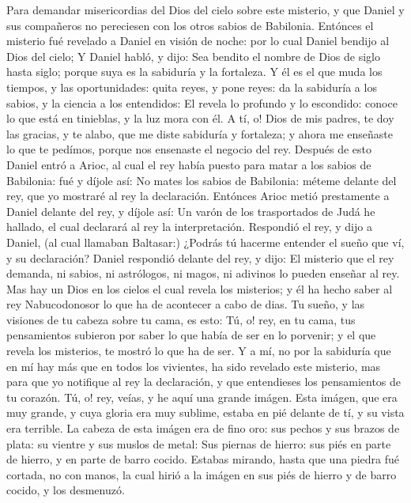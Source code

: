 \bverse Para demandar misericordias del Dios del cielo sobre este misterio, y que Daniel y sus compañeros no pereciesen con los otros sabios de Babilonia.
\bverse Entónces el misterio fué revelado a Daniel en visión de noche: por lo cual Daniel bendijo al Dios del cielo;
\bverse Y Daniel habló, y dijo: Sea bendito el nombre de Dios de siglo hasta siglo; porque suya es la sabiduría y la fortaleza.
\bverse Y él es el que muda los tiempos, y las oportunidades: quita reyes, y pone reyes: da la sabiduría a los sabios, y la ciencia a los entendidos:
\bverse El revela lo profundo y lo escondido: conoce lo que está en tinieblas, y la luz mora con él.
\bverse A tí, o! Dios de mis padres, te doy las gracias, y te alabo, que me diste sabiduría y fortaleza; y ahora me enseñaste lo que te pedímos, porque nos ensenaste el negocio del rey.
\bverse Después de esto Daniel entró a Arioc, al cual el rey había puesto para matar a los sabios de Babilonia: fué y díjole así: No mates los sabios de Babilonia: méteme delante del rey, que yo mostraré al rey la declaración.
\bverse Entónces Arioc metió prestamente a Daniel delante del rey, y díjole así: Un varón de los trasportados de Judá he hallado, el cual declarará al rey la interpretación.
\bverse Respondió el rey, y dijo a Daniel, (al cual llamaban Baltasar:) ¿Podrás tú hacerme entender el sueño que ví, y su declaración?
\bverse Daniel respondió delante del rey, y dijo: El misterio que el rey demanda, ni sabios, ni astrólogos, ni magos, ni adivinos lo pueden enseñar al rey.
\bverse Mas hay un Dios en los cielos el cual revela los misterios; y él ha hecho saber al rey Nabucodonosor lo que ha de acontecer a cabo de dias. Tu sueño, y las visiones de tu cabeza sobre tu cama, es esto:
\bverse Tú, o! rey, en tu cama, tus pensamientos subieron por saber lo que había de ser en lo porvenir; y el que revela los misterios, te mostró lo que ha de ser.
\bverse Y a mí, no por la sabiduría que en mí hay más que en todos los vivientes, ha sido revelado este misterio, mas para que yo notifique al rey la declaración, y que entendieses los pensamientos de tu corazón.
\bverse Tú, o! rey, veías, y he aquí una grande imágen. Esta imágen, que era muy grande, y cuya gloria era muy sublime, estaba en pié delante de tí, y su vista era terrible.
\bverse La cabeza de esta imágen era de fino oro: sus pechos y sus brazos de plata: su vientre y sus muslos de metal:
\bverse Sus piernas de hierro: sus piés en parte de hierro, y en parte de barro cocido.
\bverse Estabas mirando, hasta que una piedra fué cortada, no con manos, la cual hirió a la imágen en sus piés de hierro y de barro cocido, y los desmenuzó.
